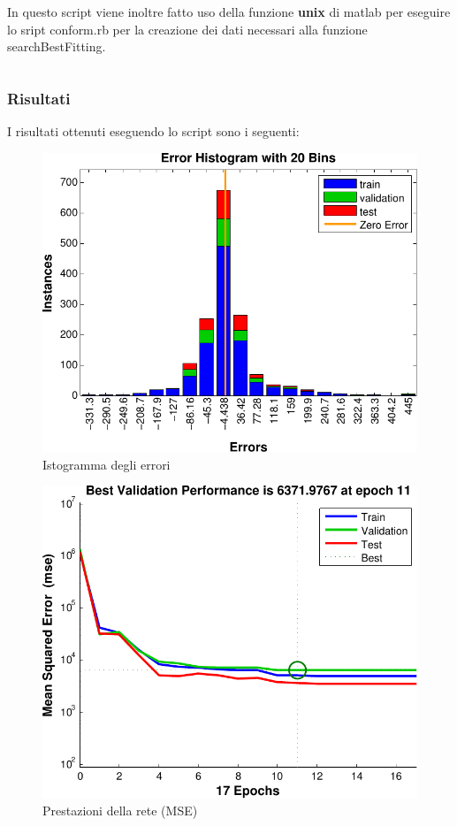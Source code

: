 In questo script viene inoltre fatto uso della funzione {\bf unix} di matlab per eseguire lo sript conform.rb per la creazione dei dati necessari alla funzione searchBestFitting.

\inputminted[linenos=true,fontsize=\footnotesize]{matlab}{../../src/netfit.m}


\subsubsection{Risultati}
I risultati ottenuti eseguendo lo script sono i seguenti:

\begin{figure}
  \centering
  \includegraphics[scale=0.7]{images/neural_net/histogram.pdf}
  \caption{Istogramma degli errori}
\end{figure}

\begin{figure}
  \centering
  \includegraphics[scale=0.7]{images/neural_net/performances.pdf}
  \caption{Prestazioni della rete (MSE)}
\end{figure}

